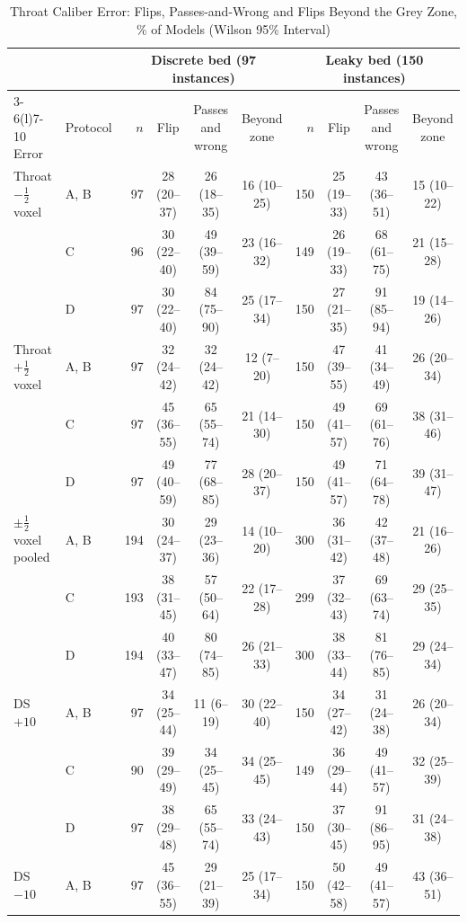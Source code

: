 \documentclass[journal,twoside,web,onecolumn]{ieeecolor}
\begin{document}
\begin{table}[!ht]
\caption{Throat Caliber Error: Flips, Passes-and-Wrong and Flips Beyond the Grey Zone, \% of Models (Wilson 95\% Interval)}\label{tab:throat}
\centering\footnotesize\setlength{\tabcolsep}{3pt}
\begin{tabular}{@{}llrccc rccc@{}}
\toprule
 & & \multicolumn{4}{c}{Discrete bed (97 instances)} & \multicolumn{4}{c}{Leaky bed (150 instances)}\\
\cmidrule(lr){3-6}\cmidrule(l){7-10}
Error & Protocol & $n$ & Flip & Passes and wrong & Beyond zone & $n$ & Flip & Passes and wrong & Beyond zone\\
\midrule
Throat $-\tfrac12$ voxel & A, B & 97 & 28 (20--37) & 26 (18--35) & 16 (10--25) & 150 & 25 (19--33) & 43 (36--51) & 15 (10--22) \\
 & C & 96 & 30 (22--40) & 49 (39--59) & 23 (16--32) & 149 & 26 (19--33) & 68 (61--75) & 21 (15--28) \\
 & D & 97 & 30 (22--40) & 84 (75--90) & 25 (17--34) & 150 & 27 (21--35) & 91 (85--94) & 19 (14--26) \\
\addlinespace[2pt]
Throat $+\tfrac12$ voxel & A, B & 97 & 32 (24--42) & 32 (24--42) & 12 (7--20) & 150 & 47 (39--55) & 41 (34--49) & 26 (20--34) \\
 & C & 97 & 45 (36--55) & 65 (55--74) & 21 (14--30) & 150 & 49 (41--57) & 69 (61--76) & 38 (31--46) \\
 & D & 97 & 49 (40--59) & 77 (68--85) & 28 (20--37) & 150 & 49 (41--57) & 71 (64--78) & 39 (31--47) \\
\addlinespace[2pt]
$\pm\tfrac12$ voxel pooled & A, B & 194 & 30 (24--37) & 29 (23--36) & 14 (10--20) & 300 & 36 (31--42) & 42 (37--48) & 21 (16--26) \\
 & C & 193 & 38 (31--45) & 57 (50--64) & 22 (17--28) & 299 & 37 (32--43) & 69 (63--74) & 29 (25--35) \\
 & D & 194 & 40 (33--47) & 80 (74--85) & 26 (21--33) & 300 & 38 (33--44) & 81 (76--85) & 29 (24--34) \\
\addlinespace[2pt]
DS $+10$ & A, B & 97 & 34 (25--44) & 11 (6--19) & 30 (22--40) & 150 & 34 (27--42) & 31 (24--38) & 26 (20--34) \\
 & C & 90 & 39 (29--49) & 34 (25--45) & 34 (25--45) & 149 & 36 (29--44) & 49 (41--57) & 32 (25--39) \\
 & D & 97 & 38 (29--48) & 65 (55--74) & 33 (24--43) & 150 & 37 (30--45) & 91 (86--95) & 31 (24--38) \\
\addlinespace[2pt]
DS $-10$ & A, B & 97 & 45 (36--55) & 29 (21--39) & 25 (17--34) & 150 & 50 (42--58) & 49 (41--57) & 43 (36--51) \\

\end{tabular}
\end{table}
\end{document}
